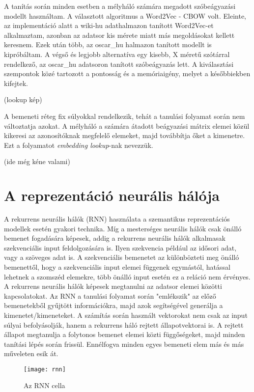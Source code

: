 A tanítás során minden esetben a mélyháló számára megadott szóbeágyazási modellt használtam. A választott algoritmus a Word2Vec - CBOW volt. Eleinte, az implementáció alatt a wiki-hu adathalmazon tanított Word2Vec-et alkalmaztam, azonban az adatsor kis mérete miatt más megoldásokat kellett keresnem.  Ezek után több, az oscar\_hu halmazon tanított modellt is kipróbáltam. A végső és legjobb alternatíva egy kisebb, X méretű szótárral rendelkező, az oscar\_hu adatsoron tanított szóbeágyazás lett. A kiválasztási szempontok közé tartozott a pontosság és a memóriaigény, melyet a későbbiekben kifejtek.

(lookup kép)

A bemeneti réteg fix súlyokkal rendelkezik, tehát a tanulási folyamat során nem változtatja azokat. A mélyháló a számára átadott beágyazási mátrix elemei közül kikeresi az azonosítóknak megfelelő elemeket, majd továbbítja őket a kimenetre. Ezt a folyamatot \textit{embedding lookup}-nak nevezzük.

(ide még kéne valami)

\section{A reprezentáció neurális hálója}

A rekurrens neurális hálók (RNN) használata a szemantikus reprezentációs modellek esetén gyakori technika. Míg a mesterséges neurális hálók csak önálló bemenet fogadására képesek, addig a rekurrens neurális hálók alkalmasak szekvenciális input feldolgozására is. Ilyen szekvencia például az idősori adat, vagy a szöveges adat is. A szekvenciális bemenetet az különbözteti meg önálló bemenettől, hogy a szekvenciális input elemei függenek egymástól, hatással lehetnek a szomszéd elemekre, több önálló input esetén ez a reláció nem érvényes.
A rekurrens neurális hálók képesek megtanulni az adatsor elemei közötti kapcsolatokat. Az RNN a tanulási folyamat során "emlékszik" az előző bemenetekből gyűjtött információkra, majd azok segítségével generálja a kimenetet/kimeneteket. A számítás során használt vektorokat nem csak az input súlyai befolyásolják, hanem a rekurrens háló rejtett állapotvektorai is. A rejtett állapot megtanulja a folytonos bemenet elemei közti függőségeket, majd minden tanítási lépés során frissül. Ennélfogva minden egyes bemeneti elem más és más műveleten esik át.

\begin{figure}[H]
	\centering
	\texttt{[image: rnn]}
	\caption{Az RNN cella}
\end{figure}

